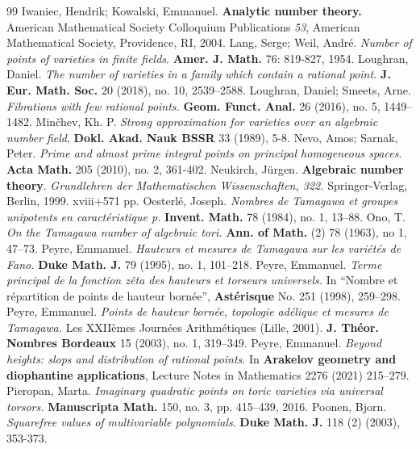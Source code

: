 \documentclass[11pt,letterpaper]{amsart}
\theoremstyle{plain}
\numberwithin{equation}{section}
\theoremstyle{definition}
\theoremstyle{remark}
\begin{document}
\begin{thebibliography}{99}
	Iwaniec, Hendrik;  Kowalski, Emmanuel. \textbf{Analytic number theory.} American Mathematical Society Colloquium Publications {\em 53}, American Mathematical Society, Providence, RI, 2004.
	 Lang, Serge; Weil, Andr\'e. \emph{Number of points of varieties in finite fields}. \textbf{Amer. J. Math.} 76: 819-827, 1954.
	 Loughran, Daniel. \emph{The number of varieties in a family which contain a rational point.} \textbf{J. Eur. Math. Soc.} 20 (2018), no. 10, 2539--2588.
	 Loughran, Daniel; Smeets, Arne. \emph{Fibrations with few rational points.} \textbf{Geom. Funct. Anal. } 26 (2016), no. 5, 1449--1482.
	 Min\v{c}hev, Kh. P. \emph{Strong approximation for varieties over an algebraic number field}, \textbf{Dokl. Akad. Nauk BSSR} 33 (1989), 5-8.
	 Nevo, Amos; Sarnak, Peter. \emph{Prime and almost prime integral points on principal homogeneous spaces}. \textbf{Acta Math.} 205 (2010), no. 2, 361-402.  
	Neukirch, Jürgen. \textbf{Algebraic number theory}. \emph{Grundlehren der Mathematischen Wissenschaften, 322.} Springer-Verlag, Berlin, 1999. xviii+571 pp. 
	 Oesterlé, Joseph. \emph{Nombres de Tamagawa et groupes unipotents en caractéristique p.} \textbf{Invent. Math.} 78 (1984), no. 1, 13--88. 
	 Ono, T. \emph{On the Tamagawa number of algebraic tori.} \textbf{Ann. of Math.} (2) 78 (1963), no 1, 47--73.
	 Peyre, Emmanuel. \emph{Hauteurs et mesures de Tamagawa sur les variétés de Fano.} \textbf{Duke Math. J.} 79 (1995), no. 1, 101--218.
	 Peyre, Emmanuel. \emph{Terme principal de la fonction zêta des hauteurs et torseurs universels.} In ``Nombre et répartition de points de hauteur bornée'', \textbf{Astérisque} No. 251 (1998), 259--298. 
	 Peyre, Emmanuel. \emph{Points de hauteur bornée, topologie adélique et mesures de Tamagawa.} Les XXIIèmes Journées Arithm\'etiques (Lille, 2001). \textbf{J. Théor. Nombres Bordeaux} 15 (2003), no. 1, 319--349. 
	 Peyre, Emmanuel. \emph{Beyond heights: slops and distribution of rational points}. In \textbf{Arakelov geometry and diophantine applications}, Lecture Notes in Mathematics 2276 (2021) 215--279.
	 Pieropan, Marta. \emph{Imaginary quadratic points on toric varieties via universal torsors.} \textbf{Manuscripta Math.} 150, no. 3, pp. 415--439, 2016.
	  Poonen,  Bjorn. \emph{Squarefree values of multivariable polynomials}. \textbf{Duke Math. J.} 118 (2) (2003), 353-373.

\end{thebibliography}
\end{document}
